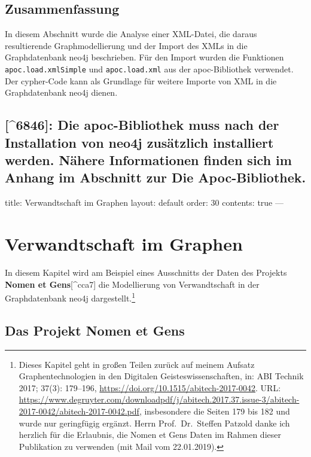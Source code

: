 \documentclass[12pt,ngerman,]{article}
\begin{document}
\subsection{Zusammenfassung}\label{zusammenfassung-3}

In diesem Abschnitt wurde die Analyse einer XML-Datei, die daraus
resultierende Graphmodellierung und der Import des XMLs in die
Graphdatenbank neo4j beschrieben. Für den Import wurden die Funktionen
\texttt{apoc.load.xmlSimple} und \texttt{apoc.load.xml} aus der
apoc-Bibliothek verwendet. Der cypher-Code kann als Grundlage für
weitere Importe von XML in die Graphdatenbank neo4j dienen.

\subsection{{[}\^{}6846{]}: Die apoc-Bibliothek muss nach der
Installation von neo4j zusätzlich installiert werden. Nähere
Informationen finden sich im Anhang im Abschnitt zur Die
Apoc-Bibliothek.}\label{die-apoc-bibliothek-muss-nach-der-installation-von-neo4j-zusuxe4tzlich-installiert-werden.-nuxe4here-informationen-finden-sich-im-anhang-im-abschnitt-zur-die-apoc-bibliothek.}

title: Verwandtschaft im Graphen layout: default order: 30 contents:
true ---

\section{Verwandtschaft im Graphen}\label{verwandtschaft-im-graphen}

In diesem Kapitel wird am Beispiel eines Ausschnitts der Daten des
Projekts \textbf{Nomen et Gens}{[}\^{}cca7{]} die Modellierung von
Verwandtschaft in der Graphdatenbank neo4j dargestellt.\footnote{Dieses
  Kapitel geht in großen Teilen zurück auf meinem Aufsatz
  Graphentechnologien in den Digitalen Geisteswissenschaften, in: ABI
  Technik 2017; 37(3): 179--196,
  \url{https://doi.org/10.1515/abitech-2017-0042}. URL:
  \url{https://www.degruyter.com/downloadpdf/j/abitech.2017.37.issue-3/abitech-2017-0042/abitech-2017-0042.pdf},
  insbesondere die Seiten 179 bis 182 und wurde nur geringfügig ergänzt.
  Herrn Prof.~Dr.~Steffen Patzold danke ich herzlich für die Erlaubnis,
  die Nomen et Gens Daten im Rahmen dieser Publikation zu verwenden (mit
  Mail vom 22.01.2019).}

\subsection{Das Projekt Nomen et Gens}\label{das-projekt-nomen-et-gens}
\end{document}

